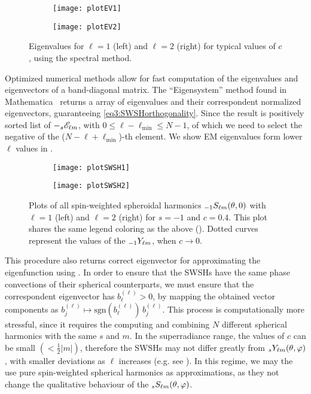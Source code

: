 \begin{figure}[h]
	\centering
	\vspace{0.2cm}
	\begin{subfigure}[c]{0.48\textwidth}
        \texttt{[image: plotEV1]}
	\end{subfigure}
	\hfill
	\begin{subfigure}[c]{0.47\textwidth}
		\texttt{[image: plotEV2]}
	\end{subfigure}
	\hfill
	\caption{Eigenvalues for $\ell=1$ (left) and $\ell=2$ (right) for typical values of $c$, using the spectral method.}
	\label{fig4:plotsEV12}
\end{figure}
Optimized numerical methods allow for fast computation of the eigenvalues and eigenvectors of a band-diagonal matrix.
The ``Eigensystem'' method found in Mathematica\texttrademark~ returns a array of eigenvalues and their correspondent normalized eigenvectors, guaranteeing \eqref{eq3:SWSHorthogonality}. Since the result is positively sorted list of $-\uu[s]{\mathscr{E}}{\ell m}$, with $0\le \ell-\ell_\mathrm{min}\le N-1$, of which we need to select the negative of the ($N-\ell+\ell_\mathrm{min}$)-th element.
We show EM eigenvalues form lower $\ell$ values in .
\begin{figure}[!b]
	\centering
	\vspace{0.2cm}
	\begin{subfigure}[c]{0.48\textwidth}
        \texttt{[image: plotSWSH1]}
	\end{subfigure}
	\hfill
	\begin{subfigure}[c]{0.48\textwidth}
		\texttt{[image: plotSWSH2]}
	\end{subfigure}
	\hfill
	\caption{Plots of all spin-weighted spheroidal harmonics $\uu[-1]{S}{\ell m}(\theta,0)$ with $\ell=1$ (left) and $\ell=2$ (right) for $s=-1$ and $c=0.4$. This plot shares the same legend coloring as the above (). Dotted curves represent the values of the $\uu[-1]{Y}{\ell m}$, when $c\to0$.}
	\label{fig4:plotSWSH12}
\end{figure}
This procedure also returns correct eigenvector for approximating the eigenfunction using .
In order to ensure that the SWSHs have the same phase convections of their spherical counterparts, we must ensure that the correspondent eigenvector has $b_\ell^{(\ell)}>0$, by mapping the obtained vector components as $b_j^{(\ell)}\mapsto \mathrm{sgn}(b_\ell^{(\ell)}) \,b_j^{(\ell)}$.
This process is computationally more stressful, since it requires the computing and combining $N$ different spherical harmonics with the same $s$ and $m$.
In the superradiance range, the values of $c$ can be small $\left(<\tfrac{1}{2}|m|\right)$, therefore the SWSHs may not differ greatly from $\uu[s]{Y}{\ell m}(\theta,\varphi)$, with smaller deviations as $\ell$ increases (e.g. see ).
In this regime, we may the use pure spin-weighted spherical harmonics as approximations, as they not change the qualitative behaviour of the $\uu[s]{S}{\ell m}(\theta,\varphi)$.

